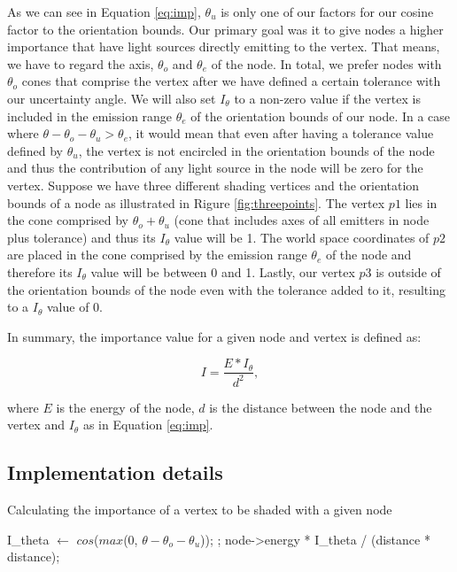 As we can see in Equation \ref{eq:imp}, $\theta_u$ is only one of our factors for our cosine factor to the orientation bounds. Our primary goal was it to give nodes a higher importance that have light sources directly emitting to the vertex. That means, we have to regard the axis, $\theta_o$ and $\theta_e$ of the node. In total, we prefer nodes with $\theta_o$ cones that comprise the vertex after we have defined a certain tolerance with our uncertainty angle. We will also set $I_\theta$ to a non-zero value if the vertex is included in the emission range $\theta_e$ of the orientation bounds of our node. In a case where $\theta - \theta_o - \theta_u > \theta_e$, it would mean that even after having a tolerance value defined by $\theta_u$, the vertex is not encircled in the orientation bounds of the node and thus the contribution of any light source in the node will be zero for the vertex. Suppose we have three different shading vertices and the orientation bounds of a node as illustrated in Rigure \ref{fig:threepoints}. The vertex $p1$ lies in the cone comprised by $\theta_o + \theta_u$ (cone that includes axes of all emitters in node plus tolerance) and thus its $I_\theta$ value will be 1. The world space coordinates of $p2$ are placed in the cone comprised by the emission range $\theta_e$ of the node and therefore its $I_\theta$ value will be between 0 and 1. Lastly, our vertex $p3$ is outside of the orientation bounds of the node even with the tolerance added to it, resulting to a $I_\theta$ value of 0.

In summary, the importance value for a given node and vertex is defined as:

\begin{equation}
\label{eq:imp2}
I = \frac{E * I_\theta}{d ^ 2},
\end{equation}

where $E$ is the energy of the node, $d$ is the distance between the node and the vertex and $I_\theta$ as in Equation \ref{eq:imp}.

\subsection{Implementation details}

\begin{algorithm}
	\caption{Calculating the importance of a vertex to be shaded with a given node}
	\label{alg:imp}
	\begin{algorithmic}[1] %
		\State I\_theta $\gets$ $cos$($max$(0, $\theta - \theta_o - \theta_u$));
		\Else
		\State {};
		\EndIf
		\State \Return node->energy * I\_theta / (distance * distance);
		\EndProcedure
	\end{algorithmic}
\end{algorithm}

